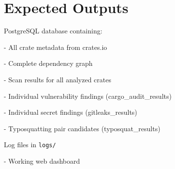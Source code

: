 \section{Expected Outputs}\label{sect:expected-outputs}
PostgreSQL database containing:

- All crate metadata from crates.io

- Complete dependency graph

- Scan results for all analyzed crates

- Individual vulnerability findings (cargo\_audit\_results)

- Individual secret findings (gitleaks\_results)

- Typosquatting pair candidates (typosquat\_results)

Log files in \texttt{logs/}

- Working web dashboard
